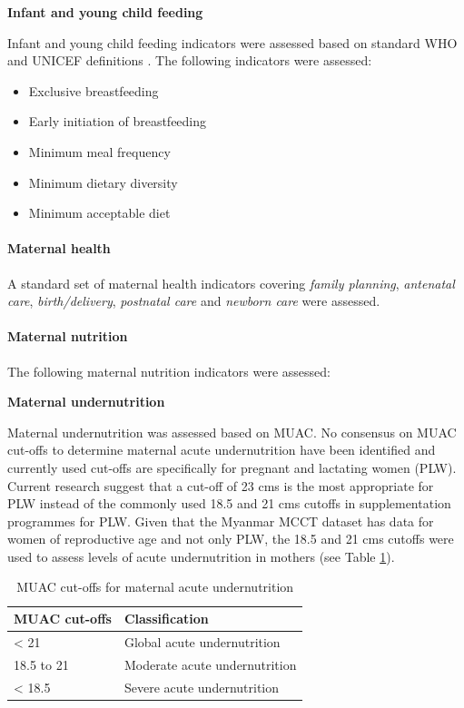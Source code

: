 \documentclass[12pt,a4paper]{article}
\let\oldparagraph\paragraph
\renewcommand{\paragraph}[1]{\oldparagraph{#1}\mbox{}}
\begin{document}
\textbf{Infant and young child feeding}

Infant and young child feeding indicators were assessed based on standard WHO and UNICEF definitions \citep{WorldHealthOrganization:2008vw}. The following indicators were assessed:

\begin{itemize}
\item
  Exclusive breastfeeding
\item
  Early initiation of breastfeeding
\item
  Minimum meal frequency
\item
  Minimum dietary diversity
\item
  Minimum acceptable diet
\end{itemize}

\hypertarget{mhealth}{%
\paragraph{Maternal health}\label{mhealth}}

A standard set of maternal health indicators covering \emph{family planning}, \emph{antenatal care}, \emph{birth/delivery}, \emph{postnatal care} and \emph{newborn care} were assessed.

\hypertarget{mnut}{%
\paragraph{Maternal nutrition}\label{mnut}}

The following maternal nutrition indicators were assessed:

\textbf{Maternal undernutrition}

Maternal undernutrition was assessed based on MUAC. No consensus on MUAC cut-offs to determine maternal acute undernutrition have been identified and currently used cut-offs are specifically for pregnant and lactating women (PLW). Current research suggest that a cut-off of 23 cms is the most appropriate for PLW \citep{Ververs:2013ee} instead of the commonly used 18.5 and 21 cms cutoffs in supplementation programmes for PLW. Given that the Myanmar MCCT dataset has data for women of reproductive age and not only PLW, the 18.5 and 21 cms cutoffs were used to assess levels of acute undernutrition in mothers (see Table \ref{tab:manthro1}).

\begin{table}[H]

\caption{\label{tab:manthro1}MUAC cut-offs for maternal acute undernutrition}
\centering
\begin{tabular}[t]{ll}
\toprule
\textbf{MUAC cut-offs} & \textbf{Classification}\\
\midrule
\rowcolor{gray!6}  < 21 & Global acute undernutrition\\
18.5 to 21 & Moderate acute undernutrition\\
\rowcolor{gray!6}  < 18.5 & Severe acute undernutrition\\
\bottomrule
\end{tabular}
\end{table}
\end{document}
